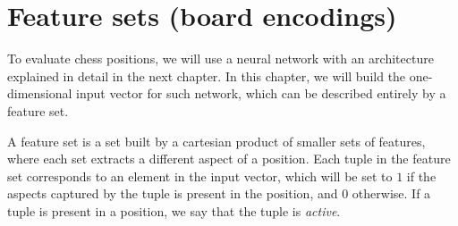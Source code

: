 \newcommand{\white}{\fullmoon}
\newcommand{\black}{\newmoon}

\newcommand{\bigtimes}{\mathop{\raisebox{-0.5ex}{\scalebox{2}{$\times$}}}}

\newcommand{\pieceBoard}{
    \newcount\pieceindex
    \setcounter{pieceindex}{0}
    \raisebox{-7ex}{
        \centering
        \chessboard[
            tinyboard,
            showmover=false,
            margin=false,
            padding=false,
            hlabel=false,
            vlabel=false,
            pgfstyle={text},
            text=\fontsize{1.2ex}{1.2ex}\bfseries\sffamily \currentwq,
            markboard
        ]
    }
}
\newcommand{\pieceRolesTable}{
    \begin{tabular}{|l|}
        \hline
        \sympawn\ Pawn \\
        \hline
        \symknight\ Knight \\
        \hline
        \symbishop\ Bishop \\
        \hline
        \symrook\ Rook \\
        \hline
        \symqueen\ Queen \\
        \hline
        \symking\ King \\
        \hline
    \end{tabular}
}
\newcommand{\pieceColorsTable}{
    \begin{tabular}{|l|}
        \hline
        $\white$ White \\
        \hline
        $\black$ Black \\
        \hline
    \end{tabular}
}

\newcommand{\fs}[1]{\textsc{#1}}


\section{Feature sets (board encodings)}

To evaluate chess positions, we will use a neural network with an architecture explained in detail in the next chapter. In this chapter, we will build the one-dimensional input vector for such network, which can be described entirely by a feature set.

A feature set is a set built by a cartesian product of smaller sets of features, where each set extracts a different aspect of a position. Each tuple in the feature set corresponds to an element in the input vector, which will be set to $1$ if the aspects captured by the tuple is present in the position, and $0$ otherwise. If a tuple is present in a position, we say that the tuple is \textit{active}.

